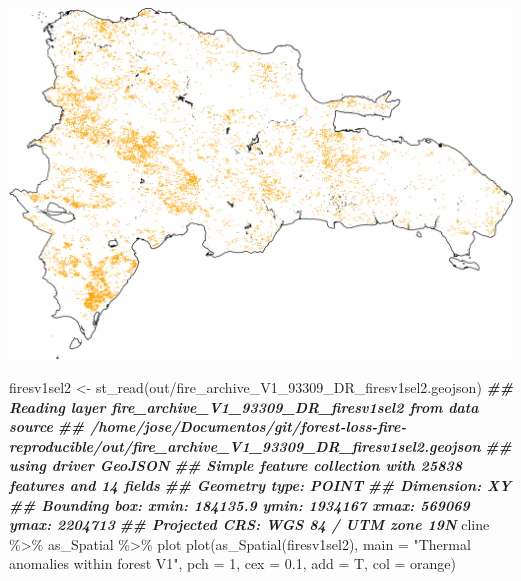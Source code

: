 \documentclass[10pt,landscape,a3paper]{article}
\newenvironment{Shaded}{\begin{snugshade}}{\end{snugshade}}
\newcommand{\AttributeTok}[1]{\textcolor[rgb]{0.77,0.63,0.00}{#1}}
\newcommand{\DecValTok}[1]{\textcolor[rgb]{0.00,0.00,0.81}{#1}}
\newcommand{\DocumentationTok}[1]{\textcolor[rgb]{0.56,0.35,0.01}{\textbf{\textit{#1}}}}
\newcommand{\FloatTok}[1]{\textcolor[rgb]{0.00,0.00,0.81}{#1}}
\newcommand{\FunctionTok}[1]{\textcolor[rgb]{0.00,0.00,0.00}{#1}}
\newcommand{\NormalTok}[1]{#1}
\newcommand{\OtherTok}[1]{\textcolor[rgb]{0.56,0.35,0.01}{#1}}
\newcommand{\SpecialCharTok}[1]{\textcolor[rgb]{0.00,0.00,0.00}{#1}}
\newcommand{\StringTok}[1]{\textcolor[rgb]{0.31,0.60,0.02}{#1}}
\begin{document}
\begin{center}\includegraphics{img/fires-m6-v1-sel2-1} \end{center}

\begin{Shaded}
\begin{Highlighting}[]
\NormalTok{firesv1sel2 }\OtherTok{\textless{}{-}} \FunctionTok{st\_read}\NormalTok{(}\StringTok{\textquotesingle{}out/fire\_archive\_V1\_93309\_DR\_firesv1sel2.geojson\textquotesingle{}}\NormalTok{)}
\DocumentationTok{\#\# Reading layer \textasciigrave{}fire\_archive\_V1\_93309\_DR\_firesv1sel2\textquotesingle{} from data source }
\DocumentationTok{\#\#   \textasciigrave{}/home/jose/Documentos/git/forest{-}loss{-}fire{-}reproducible/out/fire\_archive\_V1\_93309\_DR\_firesv1sel2.geojson\textquotesingle{} }
\DocumentationTok{\#\#   using driver \textasciigrave{}GeoJSON\textquotesingle{}}
\DocumentationTok{\#\# Simple feature collection with 25838 features and 14 fields}
\DocumentationTok{\#\# Geometry type: POINT}
\DocumentationTok{\#\# Dimension:     XY}
\DocumentationTok{\#\# Bounding box:  xmin: 184135.9 ymin: 1934167 xmax: 569069 ymax: 2204713}
\DocumentationTok{\#\# Projected CRS: WGS 84 / UTM zone 19N}
\NormalTok{cline }\SpecialCharTok{\%\textgreater{}\%}\NormalTok{ as\_Spatial }\SpecialCharTok{\%\textgreater{}\%}\NormalTok{ plot}
\FunctionTok{plot}\NormalTok{(}\FunctionTok{as\_Spatial}\NormalTok{(firesv1sel2), }\AttributeTok{main =} \StringTok{"Thermal anomalies within forest V1"}\NormalTok{,}
     \AttributeTok{pch =} \DecValTok{1}\NormalTok{, }\AttributeTok{cex =} \FloatTok{0.1}\NormalTok{, }\AttributeTok{add =}\NormalTok{ T, }\AttributeTok{col =} \StringTok{\textquotesingle{}orange\textquotesingle{}}\NormalTok{)}
\end{Highlighting}
\end{Shaded}
\end{document}

